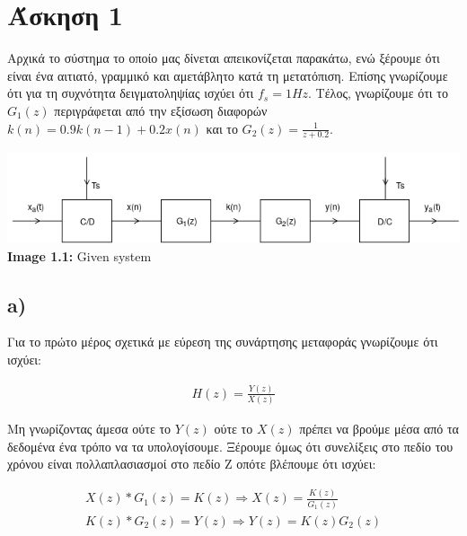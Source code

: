 \documentclass[11pt]{article}
\begin{document}
\section*{Άσκηση 1}
Αρχικά το σύστημα το οποίο μας δίνεται απεικονίζεται παρακάτω, ενώ ξέρουμε ότι είναι ένα αιτιατό, γραμμικό και αμετάβλητο κατά τη μετατόπιση. Επίσης γνωρίζουμε ότι για τη συχνότητα δειγματοληψίας ισχύει ότι $f_s=1Hz$. Τέλος, γνωρίζουμε ότι το $G_1(z)$ περιγράφεται από την εξίσωση διαφορών $k(n) = 0.9k(n-1)+0.2x(n)$ και το $G_2(z)=\frac{1}{z+0.2}$.

\begin{center}{}
    \includegraphics[scale=0.6]{photos/system-diagram.png} \\
    \textbf{Image 1.1:} Given system
\end{center}

\subsection*{a)}
Για το πρώτο μέρος σχετικά με εύρεση της συνάρτησης μεταφοράς γνωρίζουμε ότι ισχύει:

\begin{align}
    \boxed{H(z)=\frac{Y(z)}{X(z)}} \label{tranf_func}
\end{align}

\par \noindent
Μη γνωρίζοντας άμεσα ούτε το $Y(z)$ ούτε το $X(z)$ πρέπει να βρούμε μέσα από τα δεδομένα ένα τρόπο να τα υπολογίσουμε. Ξέρουμε όμως ότι συνελίξεις στο πεδίο του χρόνου είναι πολλαπλασιασμοί στο πεδίο Ζ οπότε βλέπουμε ότι ισχύει:

\begin{align}
    X(z)*G_1(z)=K(z) \Rightarrow \boxed{X(z) = \frac{K(z)}{G_1(z)}} \label{first_conv} \\
    K(z)*G_2(z)=Y(z) \Rightarrow \boxed{Y(z) = K(z)G_2(z)} \label{second_conv}
\end{align}
\end{document}
